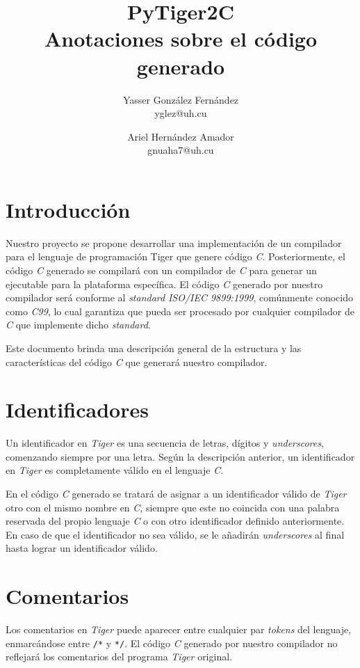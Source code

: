 \documentclass{article}
\title{
    \LARGE{PyTiger2C} \\
    \Large{Anotaciones sobre el código generado}
}
\author{
    Yasser González Fernández \\
    \small{yglez@uh.cu}
    \and
    Ariel Hernández Amador \\
    \small{gnuaha7@uh.cu}
}
\date{}
\begin{document}
\maketitle

\thispagestyle{empty}

\newpage

\setcounter{page}{1}

\section{Introducción}

Nuestro proyecto se propone desarrollar una implementación de un compilador para
el lenguaje de programación Tiger que genere código \emph{C}. Posteriormente, el
código \emph{C} generado se compilará con un compilador de \emph{C} para generar
un ejecutable para la plataforma específica. El código \emph{C} generado por
nuestro compilador será conforme al \emph{standard} \emph{ISO/IEC 9899:1999},
comúnmente conocido como \emph{C99}, lo cual garantiza que pueda ser procesado
por cualquier compilador de \emph{C} que implemente dicho \emph{standard}.

Este documento brinda una descripción general de la estructura y las
características del código \emph{C} que generará nuestro compilador.

\section{Identificadores}

Un identificador en \textit{Tiger} es una secuencia de letras, dígitos y
\textit{underscores}, comenzando siempre por una letra. Según la descripción
anterior, un identificador en \textit{Tiger} es completamente válido en el
lenguaje \textit{C}.

En el código \textit{C} generado se tratará de asignar a un identificador
válido de \textit{Tiger} otro con el mismo nombre en \textit{C}, siempre que
este no coincida con una palabra reservada del propio lenguaje \textit{C} o con
otro identificador definido anteriormente. En caso de que el identificador no
sea válido, se le añadirán \textit{underscores} al final hasta lograr un 
identificador válido.

\section{Comentarios}

Los comentarios en \textit{Tiger} puede aparecer entre cualquier par
\textit{tokens} del lenguaje, enmarcándose entre \texttt{/*} y \texttt{*/}. El
código \textit{C} generado por nuestro compilador no reflejará los comentarios
del programa \textit{Tiger} original.
\end{document}
